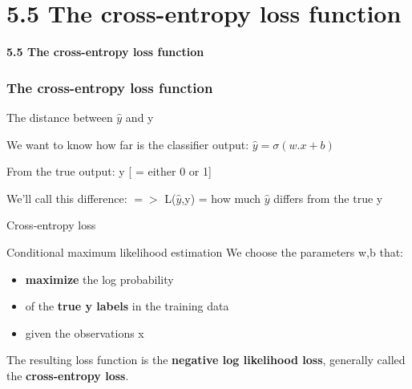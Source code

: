 \documentclass[13.5pt,aspecratio=169]{beamer}
\begin{document}
\section{5.5 The cross-entropy loss function}

\begin{frame}
    \bigskip
    \color{blue} \Huge \textbf{5.5 The cross-entropy loss function} 
\end{frame}

\begin{frame}
    \frametitle{The cross-entropy loss function}
    {\Large The distance between $\hat{y}$ and y}
    \bigskip
    \begin{block}{We want to know how far is the classifier output:}
        {\hphantom{xyz}  $\hat{y} = \sigma(w.x+b)$ }

    \end{block}

    \begin{block}{From the true output:}
        {\hphantom{xyz} y     [ = either 0 or 1]} 
    \end{block}
    \begin{block}{ We'll call this difference:}
        $=>$ L($\hat{y}$,y) = how much $\hat{y}$ differs from the true y 
    \end{block}
\end{frame}
\begin{frame}{Cross-entropy loss}
    \begin{block}{\Large Conditional maximum likelihood estimation}
        We choose the parameters w,b that: 
        \begin{itemize}
            \item \textbf{maximize} the log probability 
            \item of the \textbf{true y labels} in the training data 
            \item  given the observations x
        \end{itemize}
    \end{block}
    \begin{exampleblock}{}
         The resulting loss function is the \textbf{ negative log likelihood loss}, generally called the \textbf{cross-entropy loss}.
    \end{exampleblock}
\end{frame}
\end{document}
